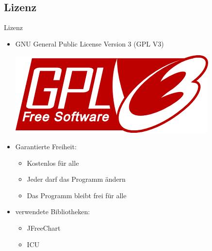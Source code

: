\documentclass[18pt]{beamer}
\begin{document}
\subsection{Lizenz}
\begin{frame}{Lizenz}
\begin{itemize}
	\item GNU General Public License Version 3 (GPL V3)
	\begin{center}
		\includegraphics[scale=0.5]{img/License-GPL3.png}
	\end{center}
	\item Garantierte Freiheit:
	\begin{itemize}
		\item Kostenlos für alle
		\item Jeder darf das Programm ändern
		\item Das Programm bleibt frei für alle
	\end{itemize}

	\item verwendete Bibliotheken:
	\begin{itemize}
		\item JFreeChart
		\item ICU
	\end{itemize}
\end{itemize}
\end{frame}
\end{document}
